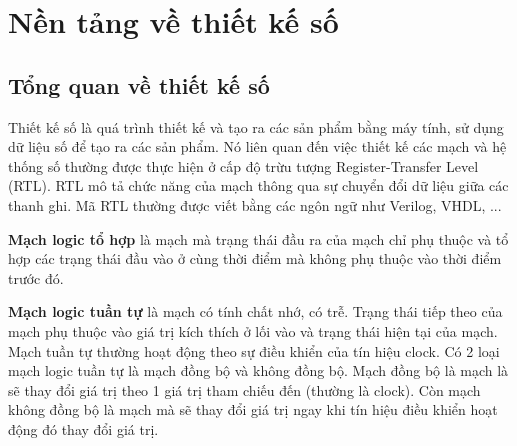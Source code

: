 \section{Nền tảng về thiết kế số}
\subsection{Tổng quan về thiết kế số}
Thiết kế số là quá trình thiết kế và tạo ra các sản phẩm bằng máy tính, sử dụng dữ liệu số để tạo ra các sản phẩm. Nó liên quan đến việc thiết kế các mạch và hệ thống số thường được thực hiện ở cấp độ trừu tượng Register-Transfer Level (RTL). RTL mô tả chức năng của mạch thông qua sự chuyển đổi dữ liệu giữa các thanh ghi. Mã RTL thường được viết bằng các ngôn ngữ như Verilog, VHDL, ...

\textbf{Mạch logic tổ hợp} là mạch mà trạng thái đầu ra của mạch chỉ phụ thuộc và tổ hợp các trạng thái đầu vào ở cùng thời điểm mà không phụ thuộc vào thời điểm trước đó.

\textbf{ Mạch logic tuần tự} là mạch có tính chất nhớ, có trễ. Trạng thái tiếp theo của mạch phụ thuộc vào giá trị kích thích ở lối vào và trạng thái hiện tại của mạch. Mạch tuần tự thường hoạt động theo sự điều khiển của tín hiệu clock. Có 2 loại mạch logic tuần tự là mạch đồng bộ và không đồng bộ. Mạch đồng bộ là mạch là sẽ thay đổi giá trị theo 1 giá trị tham chiếu đến (thường là clock). Còn mạch không đồng bộ là mạch mà sẽ thay đổi giá trị ngay khi tín hiệu điều khiển hoạt động đó thay đổi giá trị. 


